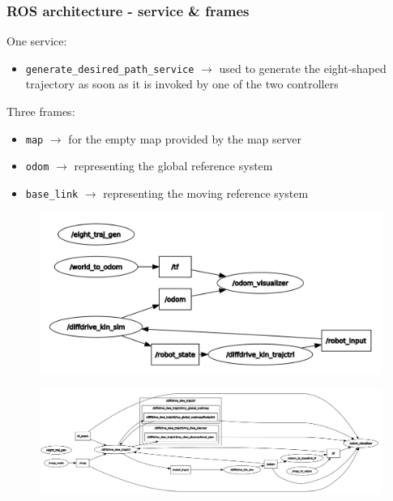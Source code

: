 \documentclass{beamer}
\begin{document}
\begin{frame}[allowframebreaks]
\frametitle{ROS architecture - service \& frames}

One service:
\begin{itemize}
  \item \texttt{generate\_desired\_path\_service} $\rightarrow$ used to generate the eight-shaped trajectory as soon as it is invoked by one of the two controllers
\end{itemize}

\vspace{2em}

Three frames:
\begin{itemize}
  \item \texttt{map} $\rightarrow$ for the empty map provided by the map server
  \item \texttt{odom} $\rightarrow$ representing the global reference system
  \item \texttt{base\_link} $\rightarrow$ representing the moving reference system
\end{itemize}

\framebreak

\begin{figure}[H]
    \centering
    \includegraphics[scale=0.14]{img/ros_tools/rqtgraph_custom.png}
\end{figure}

\vspace{-2em}

\begin{figure}[H]
    \centering
    \includegraphics[scale=0.17]{img/ros_tools/rqtgraph_dwa.png}
\end{figure}

\end{frame}
\end{document}
